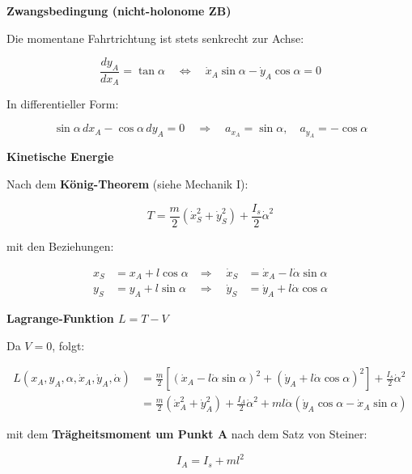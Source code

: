 \documentclass[10pt, letterpaper]{article}
\begin{document}
\textbf{Zwangsbedingung (nicht-holonome ZB)}

Die momentane Fahrtrichtung ist stets senkrecht zur Achse:

\[
\frac{dy_A}{dx_A} = \tan\alpha 
\quad \Leftrightarrow \quad
\dot{x}_A \sin\alpha - \dot{y}_A \cos\alpha = 0
\]

\noindent
In differentieller Form:

\[
\sin\alpha \, dx_A - \cos\alpha \, dy_A = 0
\quad \Rightarrow \quad
a_{x_A} = \sin\alpha, \quad a_{y_A} = -\cos\alpha
\]

\textbf{Kinetische Energie}

Nach dem \textbf{König-Theorem} (siehe Mechanik I):

\[
T = \frac{m}{2} (\dot{x}_S^2 + \dot{y}_S^2) + \frac{I_s}{2} \dot{\alpha}^2
\]

mit den Beziehungen:

\begin{align*}
x_S &= x_A + l \cos\alpha 
&\Rightarrow \quad \dot{x}_S &= \dot{x}_A - l \dot{\alpha} \sin\alpha \\
y_S &= y_A + l \sin\alpha 
&\Rightarrow \quad \dot{y}_S &= \dot{y}_A + l \dot{\alpha} \cos\alpha
\end{align*}

\textbf{Lagrange-Funktion \( L = T - V \)}

Da \( V = 0 \), folgt:

\begin{align*}
L(x_A, y_A, \alpha, \dot{x}_A, \dot{y}_A, \dot{\alpha}) 
&= \frac{m}{2} \left[ (\dot{x}_A - l \dot{\alpha} \sin\alpha)^2 + (\dot{y}_A + l \dot{\alpha} \cos\alpha)^2 \right] + \frac{I_s}{2} \dot{\alpha}^2 \\[1ex]
&= \frac{m}{2} (\dot{x}_A^2 + \dot{y}_A^2) 
+ \frac{I_A}{2} \dot{\alpha}^2 
+ m l \dot{\alpha} ( \dot{y}_A \cos\alpha - \dot{x}_A \sin\alpha )
\end{align*}

mit dem \textbf{Trägheitsmoment um Punkt A} nach dem Satz von Steiner:

\[
I_A = I_s + m l^2
\]
\end{document}
